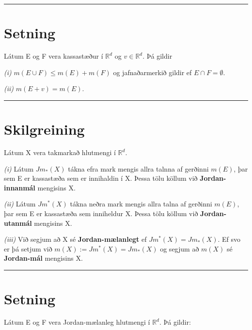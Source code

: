 \documentclass[]{book}
\begin{document}
\begin{center}\rule{0.5\linewidth}{\linethickness}\end{center}

\hypertarget{setning-10}{%
\section{Setning}\label{setning-10}}

Látum E og F vera kassastæður í \(\mathbb R^d\) og \(v \in \mathbb R^d\). Þá gildir

\emph{(i)} \(m(E\cup F) \leq m(E) + m(F)\) og jafnaðarmerkið gildir ef \(E\cap F = \emptyset\).

\emph{(ii)} \(m(E + v) = m(E)\).

\begin{center}\rule{0.5\linewidth}{\linethickness}\end{center}

\hypertarget{skilgreining-2}{%
\section{Skilgreining}\label{skilgreining-2}}

Látum X vera takmarkað hlutmengi í \(\mathbb R^d\).

\emph{(i)} Látum \(Jm_*(X)\) tákna efra mark mengis allra talnna af gerðinni \(m(E)\), þar sem E er kassastæða sem er innihaldin í X. Þessa tölu köllum við \textbf{Jordan-innanmál} mengisins X.

\emph{(ii)} Látum \(Jm^*(X)\) tákna neðra mark mengis allra talna af gerðinni \(m(E)\), þar sem E er kassastæða sem inniheldur X. Þessa tölu köllum við \textbf{Jordan-utanmál} mengisins X.

\emph{(iii)} Við segjum að X sé \textbf{Jordan-mælanlegt} ef \(Jm^*(X) = Jm_*(X)\). Ef svo er þá setjum við \(m(X) := Jm^*(X) = Jm_*(X)\) og segjum að \(m(X)\) sé \textbf{Jordan-mál} mengisins X.

\begin{center}\rule{0.5\linewidth}{\linethickness}\end{center}

\hypertarget{setning-11}{%
\section{Setning}\label{setning-11}}

Látum E og F vera Jordan-mælanleg hlutmengi í \(\mathbb R^d\). Þá gildir:
\end{document}
